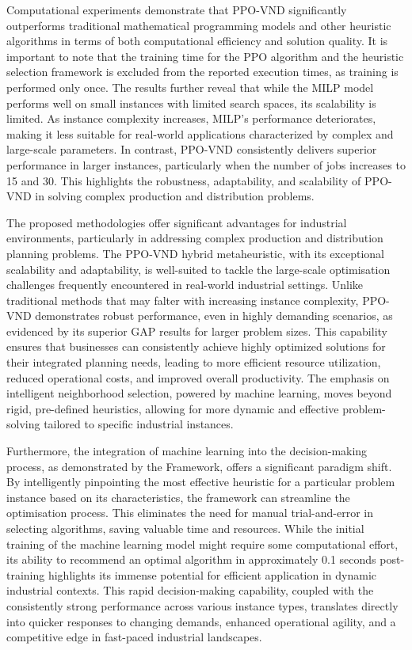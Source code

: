 \documentclass{article}
\begin{document}
Computational experiments demonstrate that PPO-VND significantly outperforms traditional mathematical programming models and other heuristic algorithms in terms of both computational efficiency and solution quality. It is important to note that the training time for the PPO algorithm and the heuristic selection framework is excluded from the reported execution times, as training is performed only once. The results further reveal that while the MILP model performs well on small instances with limited search spaces, its scalability is limited. As instance complexity increases, MILP’s performance deteriorates, making it less suitable for real-world applications characterized by complex and large-scale parameters. In contrast, PPO-VND consistently delivers superior performance in larger instances, particularly when the number of jobs increases to 15 and 30. This highlights the robustness, adaptability, and scalability of PPO-VND in solving complex production and distribution problems.

The proposed methodologies offer significant advantages for industrial environments, particularly in addressing complex production and distribution planning problems. The PPO-VND hybrid metaheuristic, with its exceptional scalability and adaptability, is well-suited to tackle the large-scale optimisation challenges frequently encountered in real-world industrial settings. Unlike traditional methods that may falter with increasing instance complexity, PPO-VND demonstrates robust performance, even in highly demanding scenarios, as evidenced by its superior GAP results for larger problem sizes. This capability ensures that businesses can consistently achieve highly optimized solutions for their integrated planning needs, leading to more efficient resource utilization, reduced operational costs, and improved overall productivity. The emphasis on intelligent neighborhood selection, powered by machine learning, moves beyond rigid, pre-defined heuristics, allowing for more dynamic and effective problem-solving tailored to specific industrial instances.

Furthermore, the integration of machine learning into the decision-making process, as demonstrated by the Framework, offers a significant paradigm shift. By intelligently pinpointing the most effective heuristic for a particular problem instance based on its characteristics, the framework can streamline the optimisation process. This eliminates the need for manual trial-and-error in selecting algorithms, saving valuable time and resources. While the initial training of the machine learning model might require some computational effort, its ability to recommend an optimal algorithm in approximately 0.1 seconds post-training highlights its immense potential for efficient application in dynamic industrial contexts. This rapid decision-making capability, coupled with the consistently strong performance across various instance types, translates directly into quicker responses to changing demands, enhanced operational agility, and a competitive edge in fast-paced industrial landscapes.
\end{document}
